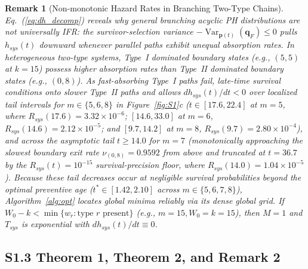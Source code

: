 \documentclass[10pt,a4paper]{article}
\newtheorem{remark}{Remark}
\begin{document}
\begin{remark}[Non-monotonic Hazard Rates in Branching Two-Type Chains]
Eq.~(\ref{eq:dh_decomp}) reveals why general branching acyclic PH distributions are \emph{not} universally IFR: the survivor-selection variance $-\operatorname{Var}_{\mathbf{p}(t)}(\mathbf{q}_F) \le 0$ pulls $h_{sys}(t)$ downward whenever parallel paths exhibit unequal absorption rates. In heterogeneous two-type systems, Type~I dominated boundary states (e.g., $(5,5)$ at $k=15$) possess higher absorption rates than Type~II dominated boundary states (e.g., $(0,8)$). As fast-absorbing Type~I paths fail, late-time survival conditions onto slower Type~II paths and allows $dh_{sys}(t)/dt < 0$ over localized tail intervals for $m \in \{5, 6, 8\}$ in Figure~\ref{fig:S1}c ($t \in [17.6, 22.4]$ at $m=5$, where $R_{sys}(17.6) = 3.32 \times 10^{-6}$; $[14.6, 33.0]$ at $m=6$, $R_{sys}(14.6) = 2.12 \times 10^{-5}$; and $[9.7, 14.2]$ at $m=8$, $R_{sys}(9.7) = 2.80 \times 10^{-4}$), and across the asymptotic tail $t \ge 14.0$ for $m = 7$ (monotonically approaching the slowest boundary exit rate $\nu_{(0,8)} = 0.9592$ from above and truncated at $t = 36.7$ by the $R_{sys}(t) = 10^{-15}$ survival-precision floor, where $R_{sys}(14.0) = 1.04 \times 10^{-5}$). Because these tail decreases occur at negligible survival probabilities beyond the optimal preventive age ($t^* \in [1.42, 2.10]$ across $m \in \{5, 6, 7, 8\}$), Algorithm~\ref{alg:opt} locates global minima reliably via its dense global grid. If $W_0 - k < \min\{w_r : \text{type } r \text{ present}\}$ (e.g., $m=15, W_0=k=15$), then $M=1$ and $T_{sys}$ is exponential with $dh_{sys}(t)/dt \equiv 0$.
\end{remark}

\subsection*{S1.3 Theorem 1, Theorem 2, and Remark 2}
\end{document}
